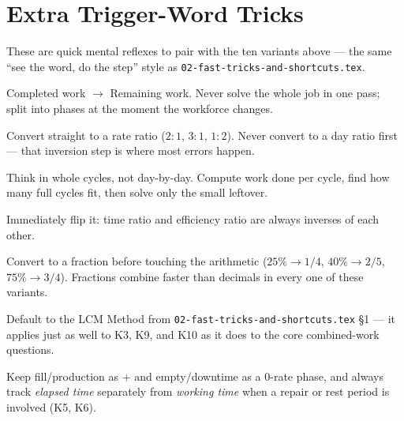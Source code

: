 \documentclass[11pt]{article}
\begin{document}
\section*{Extra Trigger-Word Tricks}

These are quick mental reflexes to pair with the ten variants above --- the same ``see the word, do
the step'' style as \texttt{02-fast-tricks-and-shortcuts.tex}.

\begin{tipbox}
Completed work $\to$ Remaining work. Never solve the whole job in one pass; split into phases at the
moment the workforce changes.
\end{tipbox}

\begin{tipbox}
Convert straight to a rate ratio ($2{:}1$, $3{:}1$, $1{:}2$). Never convert to a day ratio first ---
that inversion step is where most errors happen.
\end{tipbox}

\begin{tipbox}
Think in whole cycles, not day-by-day. Compute work done per cycle, find how many full cycles fit,
then solve only the small leftover.
\end{tipbox}

\begin{tipbox}
Immediately flip it: time ratio and efficiency ratio are always inverses of each other.
\end{tipbox}

\begin{tipbox}
Convert to a fraction before touching the arithmetic ($25\%\to1/4$, $40\%\to2/5$, $75\%\to3/4$).
Fractions combine faster than decimals in every one of these variants.
\end{tipbox}

\begin{tipbox}
Default to the LCM Method from \texttt{02-fast-tricks-and-shortcuts.tex} \S1 --- it applies just as
well to K3, K9, and K10 as it does to the core combined-work questions.
\end{tipbox}

\begin{tipbox}
Keep fill/production as $+$ and empty/downtime as a $0$-rate phase, and always track \emph{elapsed
time} separately from \emph{working time} when a repair or rest period is involved (K5, K6).
\end{tipbox}
\end{document}
